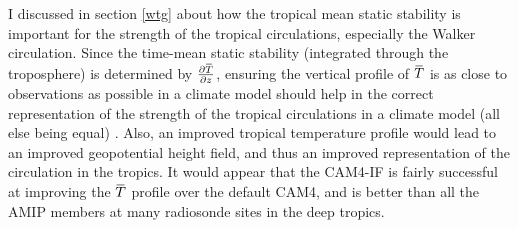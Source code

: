 \documentclass[letterpaper,12pt,titlepage,oneside,final]{book}
\newcommand{\overbar}[1]{\mkern 1.5mu\overline{\mkern-1.5mu#1\mkern-1.5mu}\mkern 1.5mu}
\begin{document}
I discussed in section \ref{wtg} about how the tropical mean static stability is important for the strength of the tropical circulations, especially the Walker circulation. Since the time-mean static stability (integrated through the troposphere) is determined by $\frac{\partial{\overbar{T}}}{\partial{z}}$, ensuring the vertical profile of $\overbar{T}$ is as close to observations as possible in a climate model should help in the correct representation of the strength of the tropical circulations in a climate model (all else being equal) \citep{sohn_role_2016,mitas_recent_2006}. Also, an improved tropical temperature profile would lead to an improved geopotential height field, and thus an improved representation of the circulation in the tropics. It would appear that the CAM4-IF is fairly successful at improving the $\overbar{T}$ profile over the default CAM4, and is better than all the AMIP members at many radiosonde sites in the deep tropics. 
\end{document}
